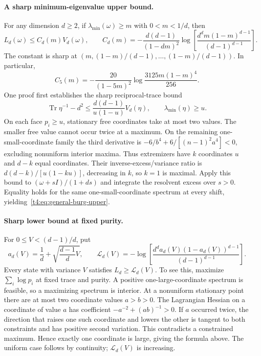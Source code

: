 \documentclass[11pt,a4paper]{article}
\begin{document}
\paragraph{A sharp minimum-eigenvalue upper bound.}
For any dimension $d\ge2$, if $\lambda_{\min}(\omega)\ge m$ with
$0<m<1/d$, then
\begin{equation}\label{t4:eq:general-burg-upper}
 L_d(\omega)\le C_d(m)V_d(\omega),\qquad
 C_d(m)=-\frac{d(d-1)}{(1-dm)^2}
 \log\left[\frac{d^d m(1-m)^{d-1}}{(d-1)^{d-1}}\right].
\end{equation}
The constant is sharp at $(m,(1-m)/(d-1),\ldots,(1-m)/(d-1))$.
In particular,
\[
 C_5(m)=-\frac{20}{(1-5m)^2}
          \log\frac{3125m(1-m)^4}{256}.
\]
One proof first establishes the sharp reciprocal-trace bound
\[
 \operatorname{Tr}\eta^{-1}-d^2
 \le\frac{d(d-1)}{u(1-u)}V_d(\eta),
 \qquad\lambda_{\min}(\eta)\ge u.
\]
On each face $p_i\ge u$, stationary free coordinates take at most two
values. The smaller free value cannot occur twice at a maximum.
On the remaining one-small-coordinate family the third derivative is
$-6/b^4+6/[(n-1)^2a^4]<0$, excluding nonuniform interior maxima.
Thus extremizers have $k$ coordinates $u$ and $d-k$ equal coordinates.
Their inverse-excess/variance ratio is
$d(d-k)/[u(1-ku)]$, decreasing in $k$, so $k=1$ is maximal.
Apply this bound to $(\omega+sI)/(1+ds)$ and integrate the resolvent
excess over $s>0$. Equality holds for the same one-small-coordinate
spectrum at every shift, yielding~\eqref{t4:eq:general-burg-upper}.

\paragraph{Sharp lower bound at fixed purity.}
For $0\le V<(d-1)/d$, put
\[
 a_d(V)=\frac1d+\sqrt{\frac{d-1}{d}V},\qquad
 \mathcal L_d(V)=-\log\left[
 \frac{d^d a_d(V)(1-a_d(V))^{d-1}}{(d-1)^{d-1}}\right].
\]
Every state with variance $V$ satisfies $L_d\ge\mathcal L_d(V)$.
To see this, maximize $\sum_i\log p_i$ at fixed trace and purity.
A positive one-large-coordinate spectrum is feasible, so a maximizing
spectrum is interior. At a nonuniform stationary point there are at most
two coordinate values $a>b>0$. The Lagrangian Hessian on a coordinate
of value $a$ has coefficient
$-a^{-2}+(ab)^{-1}>0$. If $a$ occurred twice, the direction that raises
one such coordinate and lowers the other is tangent to both constraints
and has positive second variation. This contradicts a constrained maximum.
Hence exactly one coordinate is large, giving the formula above.
The uniform case follows by continuity; $\mathcal L_d(V)$ is increasing.
\end{document}
